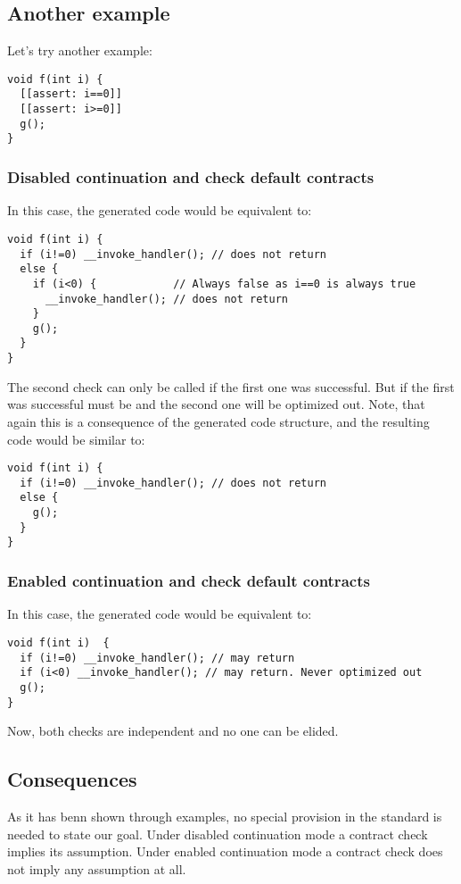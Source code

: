\subsection{Another example}

Let's try another example:

\begin{lstlisting}
void f(int i) {
  [[assert: i==0]]
  [[assert: i>=0]]
  g();
}
\end{lstlisting}

\subsubsection{Disabled continuation and check default contracts}

In this case, the generated code would be equivalent to:

\begin{lstlisting}
void f(int i) {
  if (i!=0) __invoke_handler(); // does not return
  else {
    if (i<0) {            // Always false as i==0 is always true
      __invoke_handler(); // does not return
    }
    g();
  }
}
\end{lstlisting}

The second check can only be called if the first one was successful.
But if the first was successful  must be  and the second
one will be optimized out. Note, that again this is a consequence of the 
generated code structure, and the resulting code would be similar to:

\begin{lstlisting}
void f(int i) {
  if (i!=0) __invoke_handler(); // does not return
  else {
    g();
  }
}
\end{lstlisting}


\subsubsection{Enabled continuation and check default contracts}

In this case, the generated code would be equivalent to:

\begin{lstlisting}
void f(int i)  {
  if (i!=0) __invoke_handler(); // may return
  if (i<0) __invoke_handler(); // may return. Never optimized out
  g();
}
\end{lstlisting}

Now, both checks are independent and no one can be elided.

\subsection{Consequences}

As it has benn shown through examples, no special provision in the standard is
needed to state our goal. Under disabled continuation mode a contract check implies
its assumption. Under enabled continuation mode a contract check does not imply
any assumption at all.
